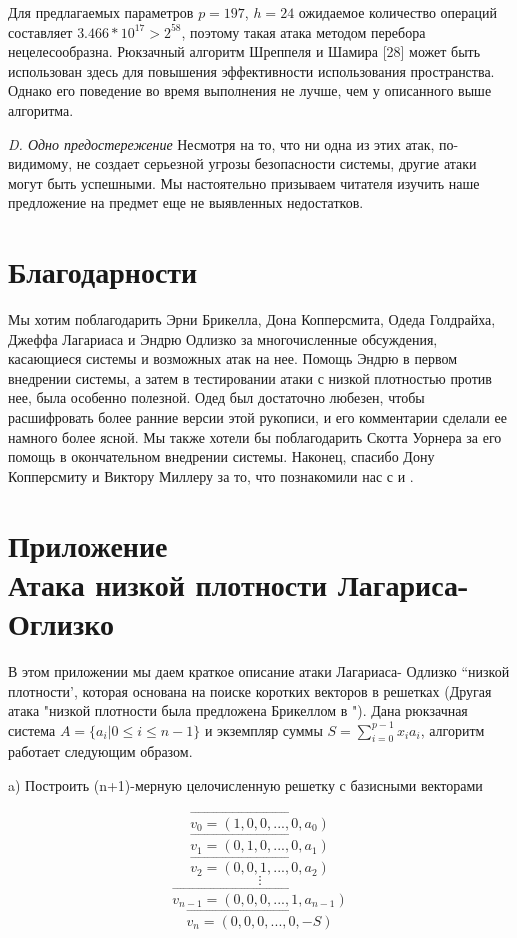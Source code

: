 \documentclass[a4paper,12pt]{article}
\newcommand{\DL}{\newline\newline}
\begin{document}
Для предлагаемых параметров $p = 197$, $h = 24$ ожидаемое количество операций составляет $3.466*10^17>2^58$, поэтому такая атака методом перебора нецелесообразна. Рюкзачный алгоритм Шреппеля и Шамира [28] может быть использован здесь для повышения эффективности использования пространства. Однако его поведение во время выполнения не лучше, чем у описанного выше алгоритма. \DL

\textsl{D. Одно предостережение}\newline
Несмотря на то, что ни одна из этих атак, по-видимому, не создает серьезной угрозы безопасности системы, другие атаки могут быть успешными. Мы настоятельно призываем читателя изучить наше предложение на предмет еще не выявленных недостатков.

\section{Благодарности}

Мы хотим поблагодарить Эрни Брикелла, Дона Копперсмита, Одеда Голдрайха, Джеффа Лагариаса и Эндрю Одлизко за многочисленные обсуждения, касающиеся системы и возможных атак на нее. Помощь Эндрю в первом внедрении системы, а затем в тестировании атаки с низкой плотностью против нее, была особенно полезной. Одед был достаточно любезен, чтобы расшифровать более ранние версии этой рукописи, и его комментарии сделали ее намного более ясной. Мы также хотели бы поблагодарить Скотта Уорнера за его помощь в окончательном внедрении системы. Наконец, спасибо Дону Копперсмиту и Виктору Миллеру за то, что познакомили нас с \cite{6} и \cite{10}.

\section{ Приложение \\ Атака низкой плотности Лагариса-Оглизко}

В этом приложении мы даем краткое описание атаки Лагариаса- Одлизко “низкой плотности’, которая основана на поиске коротких векторов в решетках (Другая атака "низкой плотности была предложена Брикеллом в \cite{4}"). Дана рюкзачная система $ A = \{a_i |  0 \leq i \leq n-1\}$ и экземпляр суммы $S = \sum_{i=0}^{p-1}x_i a_i$, алгоритм работает следующим образом. \newline

\indent  a) Построить (n+1)-мерную целочисленную решетку с базисными векторами

$$\Vec{v_0 = (1,0,0, ..., 0, a_0)}$$
$$\Vec{v_1 = (0,1,0, ..., 0, a_1)}$$
$$\Vec{v_2 = (0,0,1, ..., 0, a_2)}$$
$$\vdots$$
$$\Vec{v_{n-1} = (0,0,0, ..., 1, a_{n-1})}$$
$$\Vec{v_{n} = (0,0,0, ..., 0, -S)}$$
\end{document}
